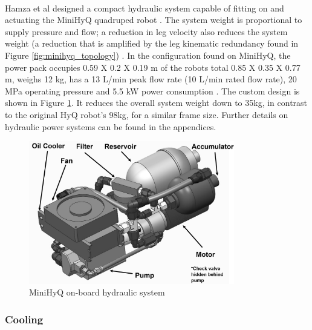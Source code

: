   \mbox{}\\

Hamza et al designed a compact hydraulic system capable of fitting on and actuating the MiniHyQ quadruped robot \cite{khan_development_2015-1}.
The system weight is proportional to supply pressure and flow; a reduction in leg velocity also reduces the system weight (a reduction that is amplified by the leg kinematic redundancy found in Figure \ref{fig:minihyq_topology}) \cite{khan_development_2015}.
In the configuration found on MiniHyQ, the power pack occupies 0.59 X 0.2 X 0.19 m of the robots total 0.85 X 0.35 X 0.77 m, weighs 12 kg, has a 13 L/min peak flow rate (10 L/min rated flow rate), 20 MPa operating pressure and 5.5 kW power consumption \cite{khan_development_2015-1}.
The custom design is shown in Figure \ref{fig:minihyq_hydraulic_cad}. It reduces the overall system weight down to 35kg, in contrast to the original HyQ robot's 98kg, for a similar frame size.
Further details on hydraulic power systems can be found in the appendices.

\begin{figure}[H]
    \centering
    \includegraphics[width=0.8\textwidth]{Sections/LiteratureReview/img/minihyq/subsys_minihqy_hydraulic.png}
    \caption{MiniHyQ on-board hydraulic system \cite{khan_development_2015-1}}
    \label{fig:minihyq_hydraulic_cad}
\end{figure}


\subsubsection{Cooling}

